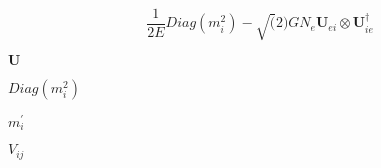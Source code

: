 \documentclass{article}
\begin{document}
\begin{equation} \frac{1}{2E} Diag(m^2_i) - \sqrt(2)G N_e \mathbf{U}_{ei} \otimes \mathbf{U}_{ie}^\dagger \end{equation}
\pagebreak

$ \mathbf{U} $
\pagebreak

$ Diag(m^2_i) $
\pagebreak

$ m_i^\prime $
\pagebreak

$ V_{ij} $
\pagebreak
\end{document}
